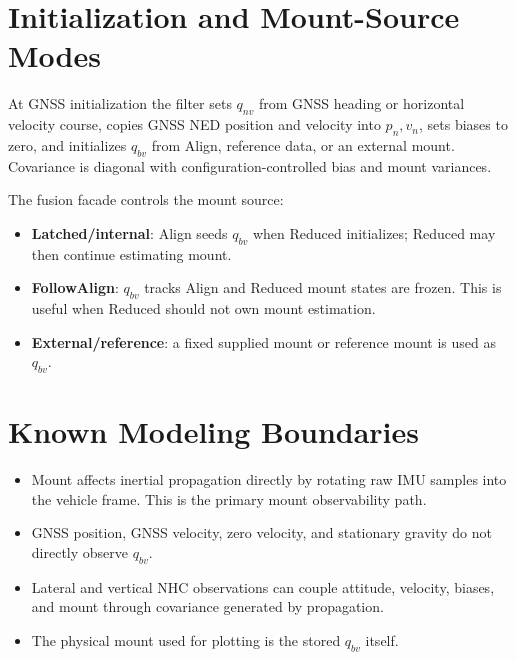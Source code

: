 \documentclass[11pt]{article}
\begin{document}
\section{Initialization and Mount-Source Modes}

At GNSS initialization the filter sets \(q_{nv}\) from GNSS heading or horizontal
velocity course, copies GNSS NED position and velocity into \(p_n,v_n\), sets
biases to zero, and initializes \(q_{bv}\) from Align, reference data, or an
external mount. Covariance is diagonal with configuration-controlled bias and
mount variances.

The fusion facade controls the mount source:
\begin{itemize}[leftmargin=1.5em]
\item \textbf{Latched/internal}: Align seeds \(q_{bv}\) when Reduced initializes;
Reduced may then continue estimating mount.
\item \textbf{FollowAlign}: \(q_{bv}\) tracks Align and Reduced mount states are
frozen. This is useful when Reduced should not own mount estimation.
\item \textbf{External/reference}: a fixed supplied mount or reference mount is
used as \(q_{bv}\).
\end{itemize}

\section{Known Modeling Boundaries}

\begin{itemize}[leftmargin=1.5em]
\item Mount affects inertial propagation directly by rotating raw IMU samples
into the vehicle frame. This is the primary mount observability path.
\item GNSS position, GNSS velocity, zero velocity, and stationary gravity do not
directly observe \(q_{bv}\).
\item Lateral and vertical NHC observations can couple attitude, velocity,
biases, and mount through covariance generated by propagation.
\item The physical mount used for plotting is the stored \(q_{bv}\) itself.
\end{itemize}
\end{document}
